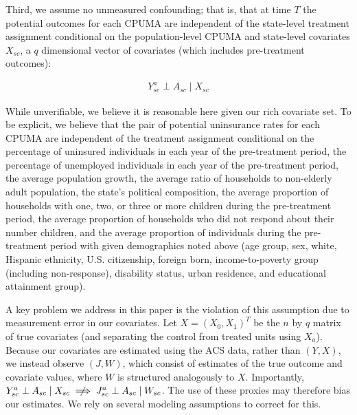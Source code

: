 \documentclass[article]{imsart}
\theoremstyle{plain}
\theoremstyle{remark}
\begin{document}
Third, we assume no unmeasured confounding; that is, that at time $T$ the potential outcomes for each CPUMA are independent of the state-level treatment assignment conditional on the population-level CPUMA and state-level covariates $X_{sc}$, a $q$ dimensional vector of covariates (which includes pre-treatment outcomes):

\begin{align*}
Y_{sc}^a \perp A_{sc} \mid X_{sc}
\end{align*}

While unverifiable, we believe it is reasonable here given our rich covariate set. To be explicit, we believe that the pair of potential uninsurance rates for each CPUMA are independent of the treatment assignment conditional on the percentage of uninsured individuals in each year of the pre-treatment period, the percentage of unemployed individuals in each year of the pre-treatment period, the average population growth, the average ratio of households to non-elderly adult population, the state's political composition, the average proportion of households with one, two, or three or more children during the pre-treatment period, the average proportion of households who did not respond about their number children, and the average proportion of individuals during the pre-treatment period with given demographics noted above (age group, sex, white, Hispanic ethnicity, U.S. citizenship, foreign born, income-to-poverty group (including non-response), disability status, urban residence, and educational attainment group). 

A key problem we address in this paper is the violation of this assumption due to measurement error in our covariates. Let 
$X = (X_0, X_1)^T$ be the $n$ by $q$ matrix of true covariates (and separating the control from treated units using $X_a$). Because our covariates are estimated using the ACS data, rather than $(Y, X)$, we instead observe $(J, W)$, which consist of estimates of the true outcome and covariate values, where $W$ is structured analogously to $X$. Importantly, $Y_{sc}^a \perp A_{sc} \mid X_{sc} \centernot\implies J_{sc}^a \perp A_{sc} \mid W_{sc}$. The use of these proxies may therefore bias our estimates. We rely on several modeling assumptions to correct for this.
\end{document}
